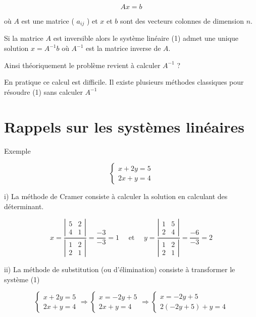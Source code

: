 \documentclass[10pt]{article}
\begin{document}
\[
A x=b
\]

où \(A\) est une matrice ( \(a_{i j}\) ) et \(x\) et \(b\) sont des vecteurs colonnes de dimension \(n\).

Si la matrice \(A\) est inversible alors le système linéaire (1) admet une unique solution \(x=A^{-1} b\) où \(A^{-1}\) est la matrice inverse de \(A\).

Ainsi théoriquement le problème revient à calculer \(A^{-1}\) ?

En pratique ce calcul est difficile. Il existe plusieurs méthodes classiques pour résoudre (1) sans calculer \(A^{-1}\)

\section*{Rappels sur les systèmes linéaires}
Exemple

\[
\left\{\begin{array}{l}
x+2 y=5 \\
2 x+y=4
\end{array}\right.
\]

i) La méthode de Cramer consiste à calculer la solution en calculant des déterminant.

\[
x=\frac{\left|\begin{array}{ll}
5 & 2 \\
4 & 1
\end{array}\right|}{\left|\begin{array}{ll}
1 & 2 \\
2 & 1
\end{array}\right|}=\frac{-3}{-3}=1 \quad \text { et } \quad y=\frac{\left|\begin{array}{ll}
1 & 5 \\
2 & 4
\end{array}\right|}{\left|\begin{array}{ll}
1 & 2 \\
2 & 1
\end{array}\right|}=\frac{-6}{-3}=2
\]

ii) La méthode de substitution (ou d'élimination) consiste à transformer le système (1)

\[
\left\{\begin{array} { l } 
{ x + 2 y = 5 } \\
{ 2 x + y = 4 }
\end{array} \Rightarrow \left\{\begin{array} { c } 
{ x = - 2 y + 5 } \\
{ 2 x + y = 4 }
\end{array} \Rightarrow \left\{\begin{array}{c}
x=-2 y+5 \\
2(-2 y+5)+y=4
\end{array}\right.\right.\right.
\]
\end{document}
